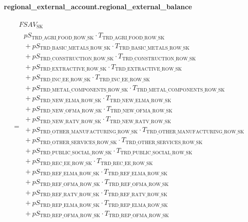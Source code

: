 \documentclass[11pt]{article}
\begin{document}
\paragraph{regional\_external\_account.regional\_external\_balance}
\begin{align*}
&\quad FSAV_{\text{SK}}\\
&= \begin{aligned}
pS_{\text{TRD\_AGRI\_FOOD\_ROW\_SK}} \cdot T_{\text{TRD\_AGRI\_FOOD\_ROW\_SK}}\\
{}+ pS_{\text{TRD\_BASIC\_METALS\_ROW\_SK}} \cdot T_{\text{TRD\_BASIC\_METALS\_ROW\_SK}}\\
{}+ pS_{\text{TRD\_CONSTRUCTION\_ROW\_SK}} \cdot T_{\text{TRD\_CONSTRUCTION\_ROW\_SK}}\\
{}+ pS_{\text{TRD\_EXTRACTIVE\_ROW\_SK}} \cdot T_{\text{TRD\_EXTRACTIVE\_ROW\_SK}}\\
{}+ pS_{\text{TRD\_INC\_EE\_ROW\_SK}} \cdot T_{\text{TRD\_INC\_EE\_ROW\_SK}}\\
{}+ pS_{\text{TRD\_METAL\_COMPONENTS\_ROW\_SK}} \cdot T_{\text{TRD\_METAL\_COMPONENTS\_ROW\_SK}}\\
{}+ pS_{\text{TRD\_NEW\_ELMA\_ROW\_SK}} \cdot T_{\text{TRD\_NEW\_ELMA\_ROW\_SK}}\\
{}+ pS_{\text{TRD\_NEW\_OFMA\_ROW\_SK}} \cdot T_{\text{TRD\_NEW\_OFMA\_ROW\_SK}}\\
{}+ pS_{\text{TRD\_NEW\_RATV\_ROW\_SK}} \cdot T_{\text{TRD\_NEW\_RATV\_ROW\_SK}}\\
{}+ pS_{\text{TRD\_OTHER\_MANUFACTURING\_ROW\_SK}} \cdot T_{\text{TRD\_OTHER\_MANUFACTURING\_ROW\_SK}}\\
{}+ pS_{\text{TRD\_OTHER\_SERVICES\_ROW\_SK}} \cdot T_{\text{TRD\_OTHER\_SERVICES\_ROW\_SK}}\\
{}+ pS_{\text{TRD\_PUBLIC\_SOCIAL\_ROW\_SK}} \cdot T_{\text{TRD\_PUBLIC\_SOCIAL\_ROW\_SK}}\\
{}+ pS_{\text{TRD\_REC\_EE\_ROW\_SK}} \cdot T_{\text{TRD\_REC\_EE\_ROW\_SK}}\\
{}+ pS_{\text{TRD\_REF\_ELMA\_ROW\_SK}} \cdot T_{\text{TRD\_REF\_ELMA\_ROW\_SK}}\\
{}+ pS_{\text{TRD\_REF\_OFMA\_ROW\_SK}} \cdot T_{\text{TRD\_REF\_OFMA\_ROW\_SK}}\\
{}+ pS_{\text{TRD\_REF\_RATV\_ROW\_SK}} \cdot T_{\text{TRD\_REF\_RATV\_ROW\_SK}}\\
{}+ pS_{\text{TRD\_REP\_ELMA\_ROW\_SK}} \cdot T_{\text{TRD\_REP\_ELMA\_ROW\_SK}}\\
{}+ pS_{\text{TRD\_REP\_OFMA\_ROW\_SK}} \cdot T_{\text{TRD\_REP\_OFMA\_ROW\_SK}}\\

\end{aligned}
\end{align*}
\end{document}
